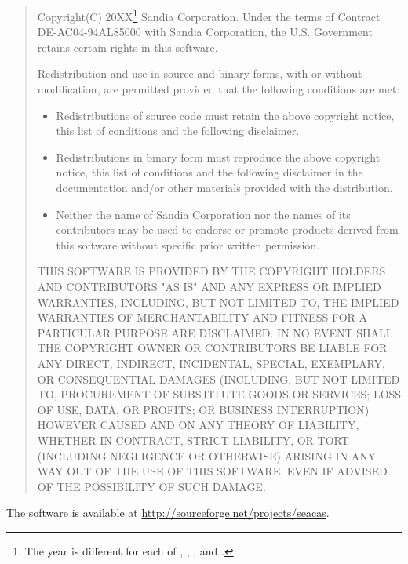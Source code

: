 \begin{quote}
Copyright(C) 20XX\footnote{The year is different for each of \epu{},
\exodiff, \ejoin, and \conjoin.} Sandia Corporation.  Under the terms of Contract
DE-AC04-94AL85000 with Sandia Corporation, the U.S. Government retains
certain rights in this software.

Redistribution and use in source and binary forms, with or without
modification, are permitted provided that the following conditions are
met:

\begin{itemize}
\item Redistributions of source code must retain the above copyright
      notice, this list of conditions and the following disclaimer.

\item Redistributions in binary form must reproduce the above
      copyright notice, this list of conditions and the following
      disclaimer in the documentation and/or other materials provided
      with the distribution.

\item Neither the name of Sandia Corporation nor the names of its
      contributors may be used to endorse or promote products derived
      from this software without specific prior written permission.
\end{itemize}

THIS SOFTWARE IS PROVIDED BY THE COPYRIGHT HOLDERS AND CONTRIBUTORS
"AS IS" AND ANY EXPRESS OR IMPLIED WARRANTIES, INCLUDING, BUT NOT
LIMITED TO, THE IMPLIED WARRANTIES OF MERCHANTABILITY AND FITNESS FOR
A PARTICULAR PURPOSE ARE DISCLAIMED. IN NO EVENT SHALL THE COPYRIGHT
OWNER OR CONTRIBUTORS BE LIABLE FOR ANY DIRECT, INDIRECT, INCIDENTAL,
SPECIAL, EXEMPLARY, OR CONSEQUENTIAL DAMAGES (INCLUDING, BUT NOT
LIMITED TO, PROCUREMENT OF SUBSTITUTE GOODS OR SERVICES; LOSS OF USE,
DATA, OR PROFITS; OR BUSINESS INTERRUPTION) HOWEVER CAUSED AND ON ANY
THEORY OF LIABILITY, WHETHER IN CONTRACT, STRICT LIABILITY, OR TORT
(INCLUDING NEGLIGENCE OR OTHERWISE) ARISING IN ANY WAY OUT OF THE USE
OF THIS SOFTWARE, EVEN IF ADVISED OF THE POSSIBILITY OF SUCH DAMAGE.
\end{quote}

The software is available at \url{http://sourceforge.net/projects/seacas}.
